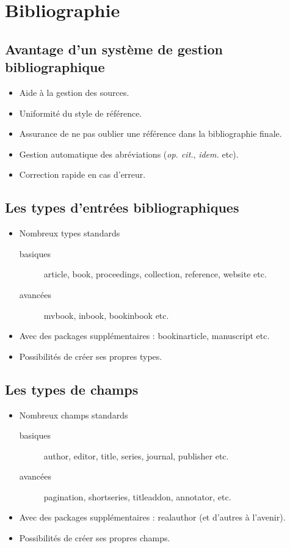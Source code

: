 \section{Bibliographie}

\subsection{Avantage d'un système de gestion bibliographique}
\begin{slide}
  \begin{itemize}
    \item Aide à la gestion des sources.
    \item Uniformité du style de référence.
    \item Assurance de ne pas oublier une référence dans la bibliographie finale.
    \item Gestion automatique des abréviations (\emph{op. cit.}, \emph{idem.} etc).
    \item Correction rapide en cas d'erreur.
  \end{itemize}
\end{slide}
\subsection{Les types d'entrées bibliographiques}
\begin{slide}
  \begin{itemize}
    \item Nombreux types standards
      \begin{description}
	\item[basiques] article, book, proceedings, collection, reference, website etc.
	\item[avancées] mvbook, inbook, bookinbook etc.
      \end{description}
    \item Avec des packages supplémentaires : bookinarticle, manuscript etc.
    \item Possibilités de créer ses propres types. 
  \end{itemize}
\end{slide}
\subsection{Les types de champs}
\begin{slide}
  \begin{itemize}
    \item Nombreux champs standards
      \begin{description}
	\item[basiques] author, editor, title, series, journal,  publisher etc.
	\item[avancées] pagination, shortseries, titleaddon, annotator, etc.
      \end{description}
    \item Avec des packages supplémentaires : realauthor (et d'autres à l'avenir).
    \item Possibilités de créer ses propres champs.
  \end{itemize}
\end{slide}


